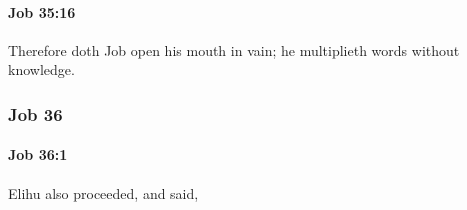 		\paragraph{Job 35:16} %
			\label{JOB-35-16}

			Therefore doth Job open his mouth in vain; he multiplieth words without knowledge.

	\subsubsection{Job 36} %
		\label{JOB-36}

		\paragraph{Job 36:1} %
			\label{JOB-36-1}

			Elihu also proceeded, and said,


